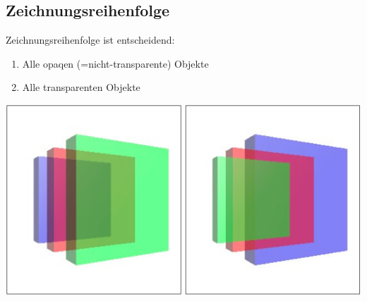 \documentclass[10pt]{article}
\begin{document}
\subsection{Zeichnungsreihenfolge}
Zeichnungsreihenfolge ist entscheidend:
\begin{enumerate}
	\item Alle opaqen (=nicht-transparente) Objekte
	\item Alle transparenten Objekte
\end{enumerate}
\begin{center}
	\includegraphics[scale=0.2]{alphablending_order.png}
\end{center}
\end{document}
